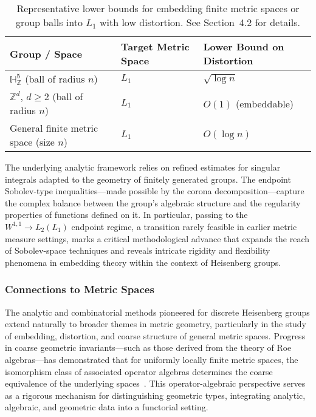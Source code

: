 \documentclass[sigconf]{acmart}
\begin{document}
\begin{table*}[htbp]
\centering
\caption{Representative lower bounds for embedding finite metric spaces or group balls into $L_1$ with low distortion. See Section~4.2 for details.}
\label{tab:embedding_bounds}
\begin{adjustbox}{max width=\textwidth}
\begin{tabular}{lll}
\toprule
\textbf{Group / Space} & \textbf{Target Metric Space} & \textbf{Lower Bound on Distortion}\\
\midrule
$\mathbb{H}^5_{\mathbb{Z}}$ (ball of radius $n$) & $L_1$ & $\sqrt{\log n}$\\
$\mathbb{Z}^d$, $d\geq 2$ (ball of radius $n$) & $L_1$ & $O(1)$ (embeddable)\\
General finite metric space (size $n$) & $L_1$ & $O(\log n)$\\
\bottomrule
\end{tabular}
\end{adjustbox}
\end{table*}

The underlying analytic framework relies on refined estimates for singular integrals adapted to the geometry of finitely generated groups. The endpoint Sobolev-type inequalities—made possible by the corona decomposition—capture the complex balance between the group's algebraic structure and the regularity properties of functions defined on it. In particular, passing to the $W^{1,1} \rightarrow L_2(L_1)$ endpoint regime, a transition rarely feasible in earlier metric measure settings, marks a critical methodological advance that expands the reach of Sobolev-space techniques and reveals intricate rigidity and flexibility phenomena in embedding theory within the context of Heisenberg groups.

\subsubsection{Connections to Metric Spaces}

The analytic and combinatorial methods pioneered for discrete Heisenberg groups extend naturally to broader themes in metric geometry, particularly in the study of embedding, distortion, and coarse structure of general metric spaces. Progress in coarse geometric invariants—such as those derived from the theory of Roe algebras—has demonstrated that for uniformly locally finite metric spaces, the isomorphism class of associated operator algebras determines the coarse equivalence of the underlying spaces~\cite{ref51}. This operator-algebraic perspective serves as a rigorous mechanism for distinguishing geometric types, integrating analytic, algebraic, and geometric data into a functorial setting.
\end{document}
